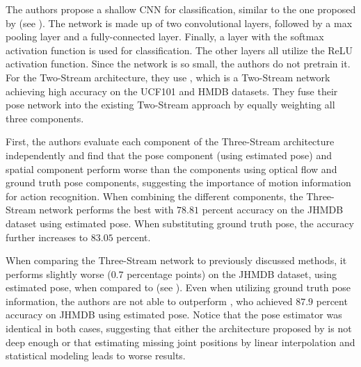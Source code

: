The authors propose a shallow CNN for classification, similar to the one proposed by \cite{choutas_potion:_2018} (see ).
The network is made up of two convolutional layers, followed by a max pooling layer and a fully-connected layer.
Finally, a layer with the softmax activation function is used for classification.
The other layers all utilize the ReLU activation function.
Since the network is so small, the authors do not pretrain it.
For the Two-Stream architecture, they use \cite{wang_temporal_2016}, which is a Two-Stream network achieving high accuracy on the UCF101 and HMDB datasets.
They fuse their pose network into the existing Two-Stream approach by equally weighting all three components. 

First, the authors evaluate each component of the Three-Stream architecture independently and find that the pose component (using estimated pose) and spatial component perform worse than the components using optical flow and ground truth pose components, suggesting the importance of motion information for action recognition.
When combining the different components, the Three-Stream network performs the best with $78.81$ percent accuracy on the JHMDB dataset using estimated pose.
When substituting ground truth pose, the accuracy further increases to $83.05$ percent.

When comparing the Three-Stream network to previously discussed methods, it performs slightly worse ($0.7$ percentage points) on the JHMDB dataset, using estimated pose, when compared to \cite{cheron_pcnn_2015} (see ).
Even when utilizing ground truth pose information, the authors are not able to outperform \cite{choutas_potion:_2018}, who achieved $87.9$ percent accuracy on JHMDB using estimated pose.
Notice that the pose estimator was identical in both cases, suggesting that either the architecture proposed by \cite{khalid_multi-modal_2018} is not deep enough or that estimating missing joint positions by linear interpolation and statistical modeling leads to worse results.
